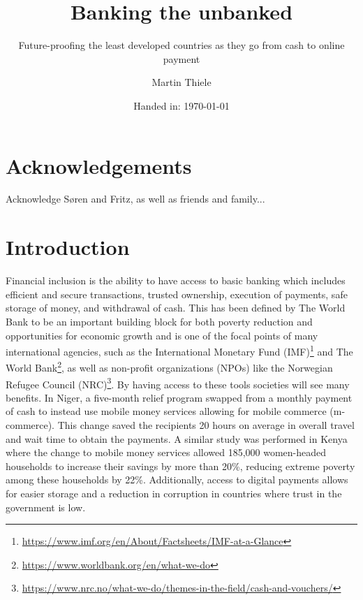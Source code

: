 \documentclass[11pt, a4paper]{article}
\author{Martin Thiele}
\title{Banking the unbanked}
\subtitle{Future-proofing the least developed countries as they go from cash to online payment}
\date{Handed in: \today}
\begin{document}
\renewcommand{\bibname}{References}


\maketitle

\begin{abstract}
\lipsum[1]
\end{abstract}

\clearpage

\section*{Acknowledgements}
Acknowledge Søren and Fritz, as well as friends and family...

\clearpage

\tableofcontents
\clearpage


\section{Introduction}

Financial inclusion is the ability to have access to basic banking which includes efficient and secure transactions, trusted ownership, execution of payments, safe storage of money, and withdrawal of cash. This has been defined by The World Bank to be an important building block for both poverty reduction and opportunities for economic growth\cite{gfindex} and is one of the focal points of many international agencies, such as the International Monetary Fund (IMF)\footnote{\url{https://www.imf.org/en/About/Factsheets/IMF-at-a-Glance}} and The World Bank\footnote{\url{https://www.worldbank.org/en/what-we-do}}, as well as non-profit organizations (NPOs) like the Norwegian Refugee Council (NRC)\footnote{\url{https://www.nrc.no/what-we-do/themes-in-the-field/cash-and-vouchers/}}. By having access to these tools societies will see many benefits. In Niger, a five-month relief program swapped from a monthly payment of cash to instead use mobile money services allowing for mobile commerce (m-commerce). This change saved the recipients 20 hours on average in overall travel and wait time to obtain the payments\cite{gfindex}. A similar study was performed in Kenya where the change to mobile money services allowed 185,000 women-headed households to increase their savings by more than 20\%, reducing extreme poverty among these households by 22\%. Additionally, access to digital payments allows for easier storage and a reduction in corruption in countries where trust in the government is low\cite{gfindex}.
\end{document}
